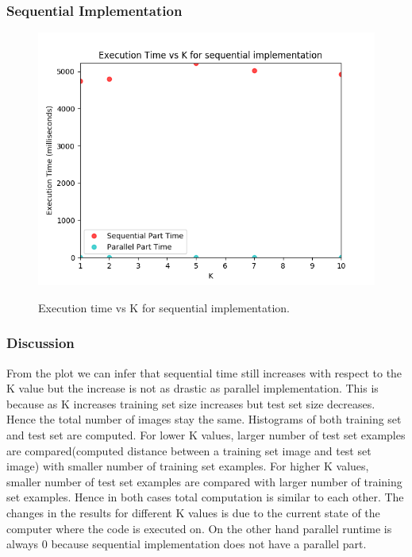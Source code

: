 \documentclass{article}
\begin{document}
\subsubsection{Sequential Implementation}
\begin{figure}[H]
\centering
\includegraphics[width=\linewidth]{assets/time_vs_K_sequential.png}
\label{fig:test1}
\vspace{-2pt}
\caption{Execution time vs K for sequential implementation.}
\end{figure}

\subsubsection{Discussion}
\qquad From the plot we can infer that sequential time still increases with respect to the K value but the increase is not as drastic as parallel implementation. This is because as K increases training set size increases but test set size decreases. Hence the total number of images stay the same. Histograms of both training set and test set are computed. For lower K values, larger number of test set examples are compared(computed distance between a training set image and test set image) with smaller number of training set examples. For higher K values, smaller number of test set examples are compared with larger number of training set examples. Hence in both cases total computation is similar to each other. The changes in the results for different K values is due to the current state of the computer where the code is executed on. On the other hand parallel runtime is always 0 because sequential implementation does not have a parallel part.
\end{document}

